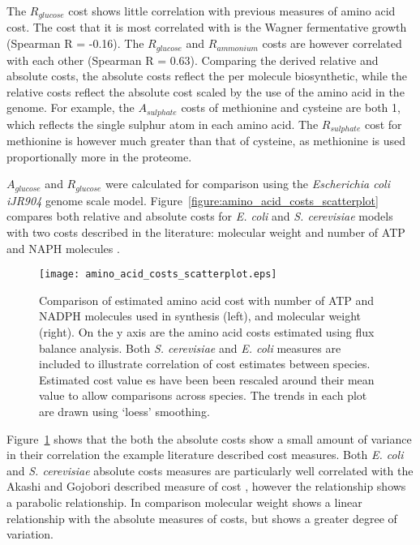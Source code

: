 The $R_{glucose}$ cost shows little correlation with previous measures of amino acid cost. The cost that it is most correlated with is the Wagner fermentative growth (Spearman R = -0.16). The $R_{glucose}$ and $R_{ammonium}$ costs are however correlated with each other (Spearman R = 0.63). Comparing the derived relative and absolute costs, the absolute costs reflect the per molecule biosynthetic, while the relative costs reflect the absolute cost scaled by the use of the amino acid in the genome. For example, the $A_{sulphate}$ costs of methionine and cysteine are both 1, which reflects the single sulphur atom in each amino acid. The $R_{sulphate}$ cost for methionine is however much greater than that of cysteine, as methionine is used proportionally more in the proteome.

$A_{glucose}$ and $R_{glucose}$ were calculated for comparison using the \emph{Escherichia coli iJR904} genome scale model. Figure~\vref{figure:amino_acid_costs_scatterplot} compares both relative and absolute costs for \emph{E. coli} and \emph{S. cerevisiae} models with two costs described in the literature: molecular weight \cite{seligmann2004} and number of ATP and NAPH molecules \cite{akashi2002}.

\begin{figure}
\centering
\texttt{[image: amino\_acid\_costs\_scatterplot.eps]}
\caption[Comparison of the genome scale model derived cost data sets.]{Comparison of estimated amino acid cost with number of ATP and NADPH molecules used in synthesis (left), and molecular weight (right). On the y axis are the amino acid costs estimated using flux balance analysis. Both \emph{S. cerevisiae} and \emph{E. coli} measures are included to illustrate correlation of cost estimates between species. Estimated cost value
es have been been rescaled around their mean value to allow comparisons across species. The trends in each plot are drawn using `loess' smoothing.}
\label{figure:amino_acid_costs_scatterplot}
\end{figure}

Figure~\ref{figure:amino_acid_costs_scatterplot} shows that the both the absolute costs show a small amount of variance in their correlation the example literature described cost measures. Both \emph{E. coli} and \emph{S. cerevisiae} absolute costs measures are particularly well correlated with the Akashi and Gojobori described measure of cost \cite{akashi2002}, however the relationship shows a parabolic relationship. In comparison molecular weight shows a linear relationship with the absolute measures of costs, but shows a greater degree of variation.

